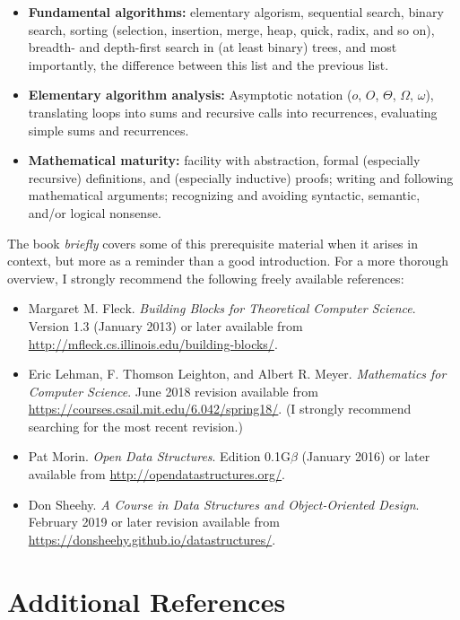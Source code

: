 \begin{itemize}
\item \textbf{Fundamental algorithms:} elementary algorism, sequential search, binary search, sorting (selection, insertion, merge, heap, quick, radix, and so on), breadth- and depth-first search in (at least binary) trees, and most importantly, the difference between this list and the previous list.
\item \textbf{Elementary algorithm analysis:} Asymptotic notation ($o$, $O$, $Θ$, $Ω$, $ω$), translating loops into sums and recursive calls into recurrences, evaluating simple sums and recurrences.
\item \textbf{Mathematical maturity:} facility with abstraction, formal (especially recursive) definitions, and (especially inductive) proofs; writing and following mathematical arguments; recognizing and avoiding syntactic, semantic, and/or logical nonsense.
\end{itemize}
The book \textit{briefly} covers some of this prerequisite material when it arises in context, but more as a reminder than a good introduction. For a more thorough overview, I strongly recommend the following freely available references:
\begin{itemize}
\item Margaret M. Fleck. \textit{Building Blocks for Theoretical Computer Science}. Version 1.3 (January 2013) or later available from {\url{http://mfleck.cs.illinois.edu/building-blocks/}}.
\item Eric Lehman, F. Thomson Leighton, and Albert R. Meyer. \textit{Mathematics for Computer Science}. June 2018 revision available from {\url{https://courses.csail.mit.edu/6.042/spring18/}}. (I strongly recommend searching for the most recent revision.)
\item Pat Morin. \textit{Open Data Structures}. Edition 0.1G$β$ (January 2016) or later available from {\url{http://opendatastructures.org/}}.
\item Don Sheehy. \textit{A Course in Data Structures and Object-Oriented Design}. February 2019 or later revision available from {\url{https://donsheehy.github.io/datastructures/}}.
\end{itemize}

\section*{Additional References}

